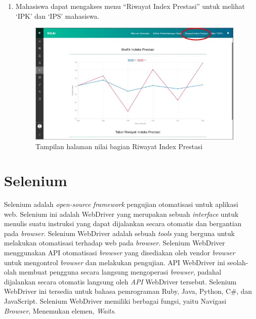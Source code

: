\begin{enumerate}
\begin{enumerate}
\begin{figure}[H]
			\label{fig:nilai_2018}
		\end{figure}
		\item Mahasiswa dapat mengakses menu ``Riwayat Index Prestasi'' untuk melihat `IPK' dan `IPS' mahasiswa.
		\begin{figure}[H]
			\centering
			\includegraphics[scale=0.7]{Gambar/rip2018.jpg}
			\caption{Tampilan halaman nilai bagian Riwayat Index Prestasi} 
			\label{fig:rip_2018}
		\end{figure}
	\end{enumerate}	
\end{enumerate}

\section{Selenium}
\label{sec:selenium}
Selenium adalah \textit{open-source} \textit{framework} pengujian otomatisasi untuk aplikasi web\cite{selenium}. Selenium ini adalah WebDriver yang merupakan sebuah \textit{interface} untuk menulis suatu instruksi yang dapat dijalankan secara otomatis dan bergantian pada \textit{browser}.  Selenium WebDriver adalah sebuah \textit{tools} yang berguna untuk melakukan otomatisasi terhadap web pada \textit{browser}. Selenium WebDriver menggunakan API otomatisasi \textit{browser} yang disediakan oleh vendor \textit{browser} untuk mengontrol \textit{browser} dan melakukan pengujian. API WebDriver ini seolah-olah membuat pengguna secara langsung mengoperasi \textit{browser}, padahal dijalankan secara otomatis langsung oleh \textit{API} WebDriver tersebut. Selenium WebDriver ini tersedia untuk bahasa pemrograman Ruby, Java, Python, C\#, dan JavaScript. Selenium WebDriver memiliki berbagai fungsi, yaitu Navigasi \textit{Browser}, Menemukan elemen, \textit{Waits}.

